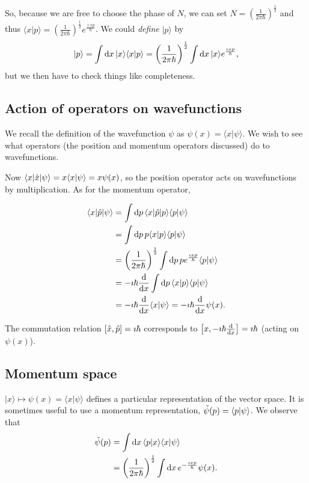 \documentclass{notes}
\newcommand{\bra}[1]{\langle#1|}
\newcommand{\ket}[1]{|#1\rangle}
\newcommand{\scp}[2]{\langle#1|#2\rangle}
\newcommand{\com}[2]{\left[#1,#2\right]}
\begin{document}
So, because we are free to choose the phase of $N$, we can set
$N=\left( \frac{1}{2 \pi \hbar} \right)^{\frac{1}{2}}$ and thus
$\scp{x}{p} = \left( \frac{1}{2 \pi \hbar} \right)^{\frac{1}{2}}
e^{\frac{\imath x p}{\hbar}}$.  We could \emph{define} $\ket{p}$ by
\[
\ket{p} = \int \ud x\, \ket{x} \scp{x}{p}
= \left( \frac{1}{2 \pi \hbar} \right)^{\frac{1}{2}} \int \ud x\, \ket{x}
e^{\frac{\imath x p}{\hbar}},
\]
but we then have to check things like completeness.

\subsection{Action of operators on wavefunctions}

We recall the definition of the wavefunction $\psi$ as $\psi(x)
=\scp{x}{\psi}$.  We wish to see what operators (the position and momentum
operators discussed) do to wavefunctions.

Now $\bra{x} \Hat{x} \ket{\psi} = x \scp{x}{\psi} = x \psi(x)$, so
the position operator acts on wavefunctions by multiplication.  As for
the momentum operator,

\begin{align*}
\bra{x} \Hat{p} \ket{\psi}
&= \int \ud p\, \bra{x} \Hat{p} \ket{p} \scp{p}{\psi} \\
&= \int \ud p\, p \scp{x}{p} \scp{p}{\psi} \\
&= \left( \frac{1}{2 \pi \hbar} \right)^{\frac{1}{2}} \int \ud p\, p
e^{\frac{\imath x p}{\hbar}} \scp{p}{\psi} \\
&= - \imath \hbar \diff{}{x} \int \ud p\, \scp{x}{p}\scp{p}{\psi} \\
&= - \imath \hbar \diff{}{x} \scp{x}{\psi} = -\imath \hbar
\diff{}{x} \psi(x). 
\end{align*}

The commutation relation $\com{\Hat{x}}{\Hat{p}} = \imath \hbar$ corresponds
to $\com{x}{-\imath \hbar \diff{}{x}} = \imath \hbar$ (acting on $\psi(x)$).

\subsection{Momentum space}

$\ket{x} \mapsto \psi(x) = \scp{x}{\psi}$ defines a particular
representation of the vector space.  It is sometimes useful to
use a momentum representation, $\Tilde{\psi}(p) = \scp{p}{\psi}$.
We observe that
\begin{align*}
\Tilde{\psi}(p) &= \int \ud x\, \scp{p}{x} \scp{x}{\psi} \\
&= \left( \frac{1}{2 \pi \hbar} \right)^{\frac{1}{2}}
\int \ud x\, e^{- \frac{\imath x p}{\hbar}} \psi(x).
\end{align*}
\end{document}
